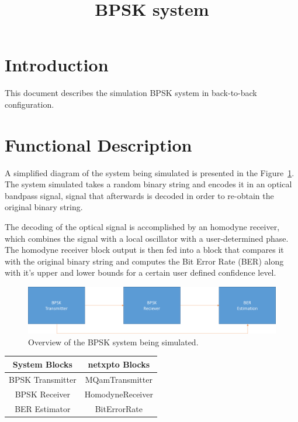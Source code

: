 \documentclass[a4paper]{article}
\title{BPSK system}
\author{ }
\date{ }
\newcommand{\onlyinsubfile}[1]{#1}
\newcommand{\notinsubfile}[1]{}
\begin{document}
\renewcommand{\onlyinsubfile}[1]{}
\renewcommand{\notinsubfile}[1]{#1}

\maketitle

\section{Introduction}

This document describes the simulation BPSK system in back-to-back configuration. 

\section{Functional Description}

A simplified diagram of the system being simulated is presented in the Figure~\ref{fig:physicalsystem}. The system simulated takes a random binary string and encodes it in an optical bandpass signal, signal that afterwards is decoded in order to re-obtain the original binary string.
\par
The decoding of the optical signal is accomplished by an homodyne receiver, which combines the signal with a local oscillator with a user-determined phase. The homodyne receiver block output is then fed into a block that compares it with the original binary string and computes the Bit Error Rate (BER) along with it's upper and lower bounds for a certain user defined confidence level.

\begin{figure}[h]
\centering
\includegraphics[width=\linewidth]{bpskdiagram.png}
\caption{Overview of the BPSK system being simulated.}
\label{fig:physicalsystem}
\end{figure}

\begin{table}[H]
\centering
\begin{tabular}{c|c}
System Blocks    & netxpto Blocks   \\ \hline
BPSK Transmitter & MQamTransmitter  \\
BPSK Receiver    & HomodyneReceiver \\
BER Estimator    & BitErrorRate                      
\end{tabular}
\end{table}
\end{document}
